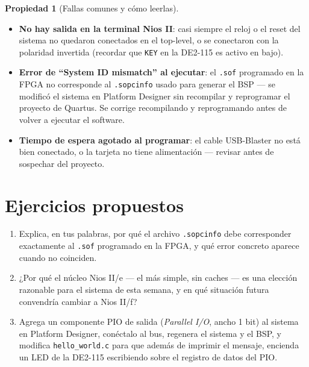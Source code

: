 \documentclass[11pt,letterpaper]{article}
\theoremstyle{definition}
\newtheorem{propiedad}[definicion]{Propiedad}
\begin{document}
\begin{propiedad}[Fallas comunes y cómo leerlas]
\begin{itemize}[leftmargin=1.2cm]
  \item \textbf{No hay salida en la terminal Nios II}: casi siempre el reloj o el reset del sistema
        no quedaron conectados en el top-level, o se conectaron con la polaridad invertida (recordar
        que \texttt{KEY} en la DE2-115 es activo en bajo).
  \item \textbf{Error de ``System ID mismatch'' al ejecutar}: el \texttt{.sof} programado en la FPGA
        no corresponde al \texttt{.sopcinfo} usado para generar el BSP --- se modificó el sistema en
        Platform Designer sin recompilar y reprogramar el proyecto de Quartus. Se corrige
        recompilando y reprogramando antes de volver a ejecutar el software.
  \item \textbf{Tiempo de espera agotado al programar}: el cable USB-Blaster no está bien conectado,
        o la tarjeta no tiene alimentación --- revisar antes de sospechar del proyecto.
\end{itemize}
\end{propiedad}

\section{Ejercicios propuestos}

\begin{enumerate}[leftmargin=1.2cm]
  \item Explica, en tus palabras, por qué el archivo \texttt{.sopcinfo} debe corresponder
        exactamente al \texttt{.sof} programado en la FPGA, y qué error concreto aparece cuando no
        coinciden.
  \item ¿Por qué el núcleo Nios II/e --- el más simple, sin caches --- es una elección razonable
        para el sistema de esta semana, y en qué situación futura convendría cambiar a Nios II/f?
  \item Agrega un componente PIO de salida (\emph{Parallel I/O}, ancho 1 bit) al sistema en Platform
        Designer, conéctalo al bus, regenera el sistema y el BSP, y modifica
        \texttt{hello\_world.c} para que además de imprimir el mensaje, encienda un LED de la
        DE2-115 escribiendo sobre el registro de datos del PIO.
\end{enumerate}
\end{document}
